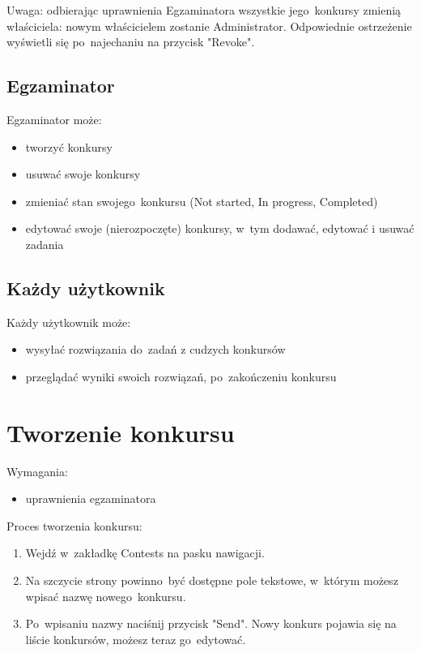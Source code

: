 \documentclass{article}
\begin{document}
Uwaga: odbierając uprawnienia Egzaminatora wszystkie jego~konkursy zmienią właściciela: nowym właścicielem zostanie Administrator. Odpowiednie ostrzeżenie wyświetli się po~najechaniu na przycisk "Revoke".

\subsection{Egzaminator}
Egzaminator może:
\begin{itemize}
    \item tworzyć konkursy
    \item usuwać swoje konkursy
    \item zmieniać stan swojego~konkursu (Not started, In progress, Completed)
    \item edytować swoje (nierozpoczęte) konkursy, w~tym dodawać, edytować i usuwać zadania
\end{itemize}

\subsection{Każdy użytkownik}
Każdy użytkownik może:
\begin{itemize}
    \item wysyłać rozwiązania do~zadań z cudzych konkursów
    \item przeglądać wyniki swoich rozwiązań, po~zakończeniu konkursu
\end{itemize}

\section{Tworzenie konkursu}
Wymagania:
\begin{itemize}
	\item uprawnienia egzaminatora
\end{itemize}
Proces tworzenia konkursu:
\begin{enumerate}
	\item Wejdź w~zakładkę Contests na pasku nawigacji.
	\item Na szczycie strony powinno~być dostępne pole tekstowe, w~którym możesz wpisać nazwę nowego~konkursu.
	\item Po~wpisaniu nazwy naciśnij przycisk "Send". Nowy konkurs pojawia się na liście konkursów, możesz teraz go~edytować.
\end{enumerate}
\end{document}
